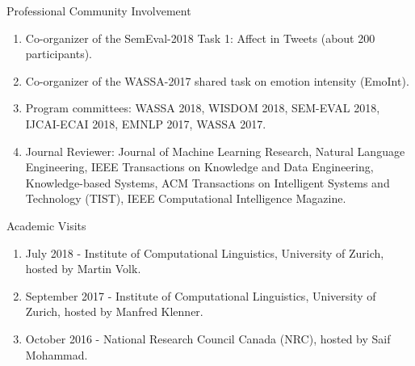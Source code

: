 \documentclass[handout]{beamer}
\begin{document}
\begin{frame}{Professional Community Involvement}
\begin{scriptsize}
  \begin{enumerate}
  \item Co-organizer of the SemEval-2018 Task 1: Affect in Tweets (about 200 participants).
  \item Co-organizer of the WASSA-2017 shared task on emotion intensity (EmoInt).
  \item Program committees: WASSA 2018, WISDOM 2018, SEM-EVAL 2018, IJCAI-ECAI 2018, EMNLP 2017, WASSA 2017.
  \item Journal Reviewer:  Journal of Machine Learning Research, Natural Language Engineering, IEEE Transactions on Knowledge and Data Engineering, Knowledge-based Systems, ACM Transactions on Intelligent Systems and Technology (TIST), IEEE Computational Intelligence Magazine.
  \end{enumerate} 
\end{scriptsize}

\end{frame}





\begin{frame}{Academic Visits}
\begin{scriptsize}
  \begin{enumerate}
\item July 2018 - Institute of Computational Linguistics, University of Zurich, hosted by Martin Volk.
\item September 2017 - Institute of Computational Linguistics, University of Zurich, hosted by Manfred Klenner.
\item October 2016 - National Research Council Canada (NRC), hosted by Saif Mohammad.
  \end{enumerate} 
\end{scriptsize}

\end{frame}
\end{document}
